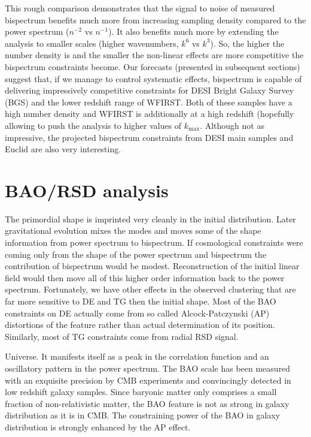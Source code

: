 This rough comparison demonstrates that the signal to noise of measured
bispectrum benefits much more from increasing sampling density  compared to
the power spectrum ($n^{-2}$ vs $n^{-1}$). It also benefits much more by
extending the analysis to smaller scales (higher wavenumbers, $k^6$ vs
$k^3$). So, the higher the number density is and the smaller the non-linear
effects are more competitive the bispectrum constraints become. Our forecasts
(presented in subsequent sections) suggest that, if we manage to control
systematic effects, bispectrum is capable of delivering impressively
competitive constraints for DESI Bright Galaxy Survey (BGS) and the lower
redshift range of WFIRST. Both of these samples have a high number density and
WFIRST is additionally at a high redshift (hopefully allowing to push the
analysis to higher values of $k_\mathrm{max}$. Although not as impressive, the
projected bispectrum constraints from DESI main samples and Euclid are also
very interesting.

\section{BAO/RSD analysis}

The primordial shape is imprinted very cleanly in the initial distribution.
Later gravitational evolution mixes the modes and moves some of the shape
information from power spectrum to bispectrum. If cosmological constraints
were coming only from the shape of the power spectrum and bispectrum the
contribution of bispectrum  would be modest. Reconstruction of the initial
linear field would then move all of this higher order information back to the
power spectrum. Fortunately, we have other effects in the observed clustering
that are far more sensitive to DE and TG then the initial shape. Most of the
BAO constraints on DE actually come from so called Alcock-Patczynski (AP)
distortions of the feature rather than actual determination of its position.
Similarly, most of TG constraints come from radial RSD signal.

Universe. It manifests itself as a peak in the correlation function and an
oscillatory pattern in the power spectrum. The BAO scale has been measured
with an exquisite precision by CMB experiments and convincingly detected in
low redshift galaxy samples. Since baryonic matter only comprises a small
fraction of non-relativistic matter, the BAO feature is not as strong in
galaxy distribution as it is in CMB. The constraining power of the BAO in
galaxy distribution is strongly enhanced by the AP effect.


